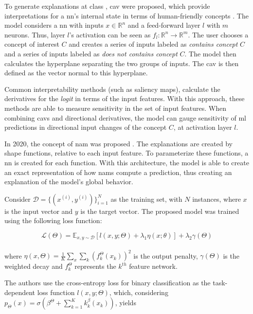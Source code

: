 To generate explanations at class , \gls{cav} were proposed, which provide interpretations for a \gls{nn}’s internal state in terms of human-friendly concepts \cite{TCAV}.
The model considers a \gls{nn} with inputs $x \in \mathbb{R}^n$ and a feed-forward layer $l$ with $m$ neurons. Thus, layer $l$'s activation can be seen as $f_l:\mathbb{R}^n \rightarrow \mathbb{R}^m$.
The user chooses a concept of interest $C$ and creates a series of inputs labeled as \textit{contains concept} $C$ and a series of inputs labeled as \textit{does not contains concept} $C$. The model then calculates the hyperplane separating the two groups of inputs. The \gls{cav} is then defined as the vector normal to this hyperplane. 

Common interpretability methods (such as saliency maps), calculate the derivatives for the \textit{logit} in terms of the input features. With this approach, these methods are able to measure sensitivity in the set of input features. When combining \gls{cav}s and directional derivatives, the model can gauge sensitivity of \gls{ml} predictions in directional input changes of the concept $C$, at activation layer $l$.

In 2020, the concept of \gls{nam} was proposed \cite{NAM}. The explanations are created by shape functions, relative to each input feature. To parameterize these functions, a \gls{nn} is created for each function. With this architecture, the model is able to create an exact representation of how \gls{nam}s compute a prediction, thus creating an explanation of the model's global behavior.

Consider $\mathcal{D} = \{(x^{(i)}, y^{(i)})\}_{i=1}^N$ as the training set, with $N$ instances, where $x$ is the input vector and $y$ is the target vector. The proposed model was trained using the following loss function:

\begin{equation}
\mathcal{L}(\Theta) = \mathds{E}_{x,y \sim \mathcal{D}} [l(x,y;\Theta) + \lambda_1\eta (x;\theta)] + \lambda_2 \gamma(\Theta)
\end{equation}
\\
where $\eta(x,\Theta) = \frac{1}{K} \sum_x \sum_k (f_k^\Theta (x_k))^2$ is the output penalty, $\gamma(\Theta)$ is the weighted decay and $f_k^\Theta$ represents the $k^{th}$ feature network.

The authors use the cross-entropy loss for binary classification as the task-dependent loss function $l(x,y;\Theta)$, which, considering $p_\Theta(x) = \sigma(\beta^\Theta +  \sum_{k=1}^K k_k^\beta(x_k))$, yields  

